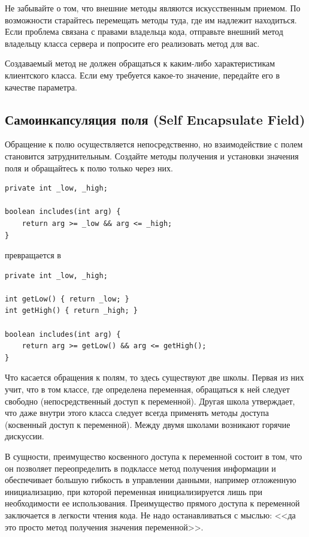 \documentclass{../../text-style}
\begin{document}
Не забывайте о том, что внешние методы являются искусственным приемом. По возможности старайтесь перемещать методы туда, где им надлежит находиться. Если проблема связана с правами владельца кода, отправьте внешний метод владельцу класса сервера и попросите его реализовать метод для вас.

Создаваемый метод не должен обращаться к каким-либо характеристикам клиентского класса. Если ему требуется какое-то значение, передайте его в качестве параметра.

\subsection{Самоинкапсуляция поля (Self Encapsulate Field)}

Обращение к полю осуществляется непосредственно, но взаимодействие с полем становится затруднительным. Создайте методы получения и установки значения поля и обращайтесь к полю только через них.

\begin{verbatim}
private int _low, _high;

boolean includes(int arg) {
    return arg >= _low && arg <= _high;
}
\end{verbatim}

превращается в 

\begin{verbatim}
private int _low, _high;

int getLow() { return _low; }
int getHigh() { return _high; }

boolean includes(int arg) {
    return arg >= getLow() && arg <= getHigh();
}
\end{verbatim}

Что касается обращения к полям, то здесь существуют две школы. Первая из них учит, что в том классе, где определена переменная, обращаться к ней следует свободно (непосредственный доступ к переменной). Другая школа утверждает, что даже внутри этого класса следует всегда применять методы доступа (косвенный доступ к переменной). Между двумя школами возникают горячие дискуссии.

В сущности, преимущество косвенного доступа к переменной состоит в том, что он позволяет переопределить в подклассе метод получения информации и обеспечивает большую гибкость в управлении данными, например отложенную инициализацию, при которой переменная инициализируется лишь при необходимости ее использования. Преимущество прямого доступа к переменной заключается в легкости чтения кода. Не надо останавливаться с мыслью: <<да это просто метод получения значения переменной>>.
\end{document}
